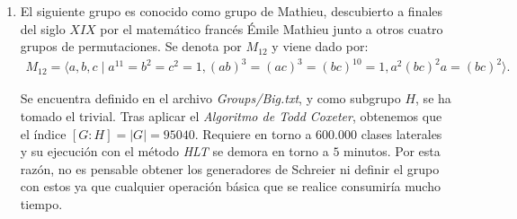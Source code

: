 \begin{enumerate}
\item El siguiente grupo es conocido como grupo de Mathieu,  descubierto a finales del siglo $XIX$ por el matemático francés Émile Mathieu junto a otros cuatro grupos de permutaciones. Se denota por $M_{12}$ y viene dado por:
\begin{align*}
    M_{12} = \langle a,b,c \mid a^{11} = b^2 = c^2 = 1, (ab)^3 = (ac)^3 = (bc)^{10} = 1, a^2(bc)^2a = (bc)^2  \rangle.
\end{align*}

Se encuentra definido en el archivo \textit{Groups/Big.txt}, y como subgrupo $H$, se ha tomado el trivial. Tras aplicar el \textit{Algoritmo de Todd Coxeter}, obtenemos que el índice $[G:H]=|G|=95040$. 
 Requiere en torno a $600$.$000$ clases laterales y su ejecución con el método \textit{HLT} se demora en torno a $5$ minutos. Por esta razón, no es pensable obtener los generadores de Schreier ni definir el grupo con estos ya que cualquier operación básica que se realice consumiría mucho tiempo.
 
\end{enumerate}
    